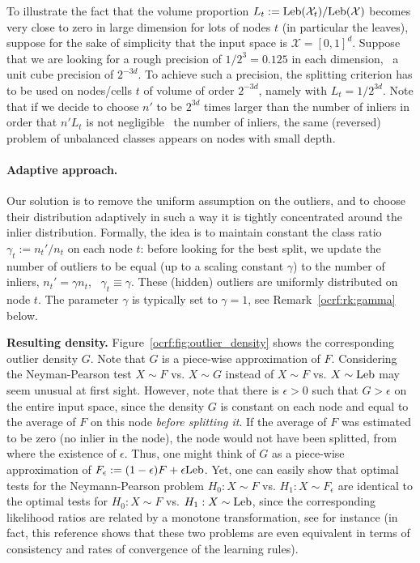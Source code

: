 %
\begin{remark}
To illustrate the fact that the volume proportion $L_t:=\text{Leb}(\mathcal{X}_t) / \text{Leb}(\mathcal{X})$ becomes very close to zero in large dimension for lots of nodes $t$ (in particular the leaves), suppose for the sake of simplicity that the input space is $\mathcal{X} = [0,1]^d$. Suppose that we are looking for a rough precision of $1/2^3=0.125$ in each dimension, \ie~a unit cube precision of $2^{-3d}$.
To achieve such a precision, the splitting criterion has to be used on nodes/cells $t$ of volume of order $2^{-3d}$, namely with $L_t = 1/2^{3d}$.
Note that if we decide to choose $n'$ to be $2^{3d}$ times larger than the number of inliers in order that $n' L_{t}$ is not negligible \wrt~the number of inliers, the same (reversed) problem of unbalanced classes appears on nodes with small depth. 
\end{remark}


\paragraph{Adaptive approach.}
Our solution is to remove the uniform assumption on the outliers, and to choose their distribution adaptively in such a way it is tightly concentrated around the inlier distribution. Formally, the idea is to maintain constant the class ratio $\gamma_t := n_t' / n_t$ on each node $t$: before looking for the best split, we update the number of outliers to be equal (up to a scaling constant $\gamma$) to the number of inliers, $n_t' = \gamma n_t$, \ie~$\gamma_t \equiv \gamma$. These (hidden) outliers are uniformly distributed on node $t$. The parameter $\gamma$ is typically set to $\gamma = 1$, see Remark~\ref{ocrf:rk:gamma} below. 

\textbf{Resulting density.} Figure~\ref{ocrf:fig:outlier_density} shows the corresponding outlier density $G$. 
Note that $G$ is a piece-wise approximation of $F$. Considering the Neyman-Pearson test $X \sim F$ vs. $X \sim G$ instead of $X \sim F$ vs. $X \sim \text{Leb}$ may seem unusual at first sight. However, note that there is $\epsilon>0$ such that $G>\epsilon$ on the entire input space, since the density $G$ is constant on each node and equal to the average of $F$ on this node \emph{before splitting it}. If the average of $F$ was estimated to be zero (no inlier in the node), the node would not have been splitted, from where the existence of $\epsilon$.
%
Thus, one might think of $G$ as  
 a piece-wise approximation of $F_\epsilon := (1 - \epsilon) F + \epsilon \text{Leb}$. Yet, one can easily show that optimal tests for the Neymann-Pearson problem $H_0: X \sim F$ vs. $H_1: X \sim F_\epsilon$ are identical to the optimal tests for $H_0: X \sim F$ vs. $H_1: X \sim \text{Leb}$, since the corresponding likelihood ratios are related by a monotone transformation, see \cite{Scott2009} for instance (in fact, this reference shows that these two problems are even equivalent in terms of consistency and rates of convergence of the learning rules).

